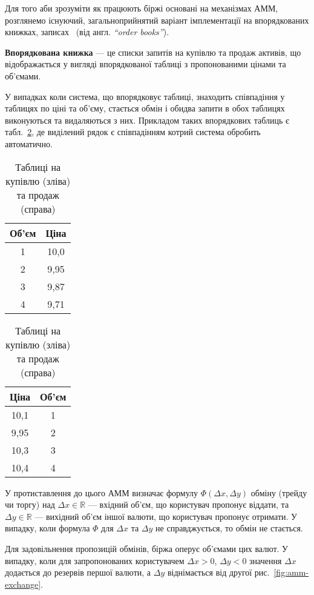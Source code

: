 \documentclass[../index.tex]{subfiles}
\begin{document}
Для того аби зрозуміти як працюють біржі основані на механізмах АММ, розглянемо
існуючий, загальноприйнятий варіант імплементації на впорядкованих книжках,
записах~\cite{MERTENS2003433} (від англ. \textit{``order books''}).

\begin{definition}
  \textbf{Впорядкована книжка} --- це списки запитів на купівлю та продаж активів, що
  відображається у вигляді впорядкованої таблиці з пропонованими цінами та
  об'ємами.
\end{definition}

У випадках коли система, що впорядковує таблиці, знаходить співпадіння у
таблицях по ціні та об'єму, стається обмін і обидва запити в обох таблицях
виконуються та видаляються з них. Прикладом таких впорядкових таблиць є
табл.~\ref{table:order-book}, де виділений рядок є співпадінням котрий система
обробить автоматично.

\begin{table}[H]
  \centering
  \begin{tabular}{ c | c }
    Об'єм & Ціна \\
    \hline \hline
    1 & 10,0 \\
    \rowcolor{green} 2 & 9,95 \\
    3 & 9,87 \\
    4 & 9,71
  \end{tabular}
  \quad
  \begin{tabular}{ c | c }
    Ціна & Об'єм \\
    \hline \hline
    10,1 & 1 \\
    \rowcolor{green} 9,95 & 2 \\
    10,3 & 3 \\
    10,4 & 4
  \end{tabular}

  \caption{Таблиці на купівлю (зліва) та продаж (справа)}\label{table:order-book}
\end{table}

У протиставлення до цього АММ визначає формулу $\Phi(\Delta x, \Delta y)$ обміну (трейду чи
торгу) над $\Delta x \in \mathbb{R}$ --- вхідний об'єм, що користувач пропонує віддати, та
$\Delta y \in \mathbb{R}$ --- вихідний об'єм іншої валюти, що користувач пропонує отримати. У
випадку, коли формула $\Phi$ для $\Delta x$ та $\Delta y$ не справджується, то обмін не
стається.

Для задовільнення пропозицій обмінів, біржа оперує об'ємами цих валют. У
випадку, коли для запропонованих користувачем $\Delta x > 0$, $\Delta y < 0$ значення
$\Delta x$ додається до резервів першої валюти, а $\Delta y$ віднімається від другої
рис.~\ref{fig:amm-exchange}.
\end{document}
